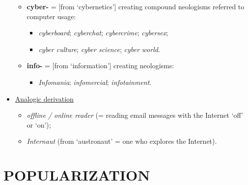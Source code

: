 \begin{itemize}
\begin{itemize}
\item \textbf{cyber-} = [from ‘cybernetics’] creating compound neologisms referred to computer usage:

\begin{itemize}

\item \textit{cyberboard}; \textit{cyberchat}; \textit{cybercrime}; \textit{cybersex};
\item \textit{cyber culture}; \textit{cyber science}; \textit{cyber world}.
\end{itemize}

\item \textbf{info-} = [from ‘information’] creating neologisms:

\begin{itemize}
\item \textit{Infomania}; \textit{infomercial}; \textit{infotainment}.
\end{itemize}

\end{itemize}

\item\underline{Analogic derivation}

\begin{itemize}

\item \textit{offline / online reader} (= reading email messages with the Internet ‘off’ or ‘on’);
\item \textit{Internaut} (from ‘austronaut’ = one who explores the Internet). 

\end{itemize}

\end{itemize}

\section{POPULARIZATION}

